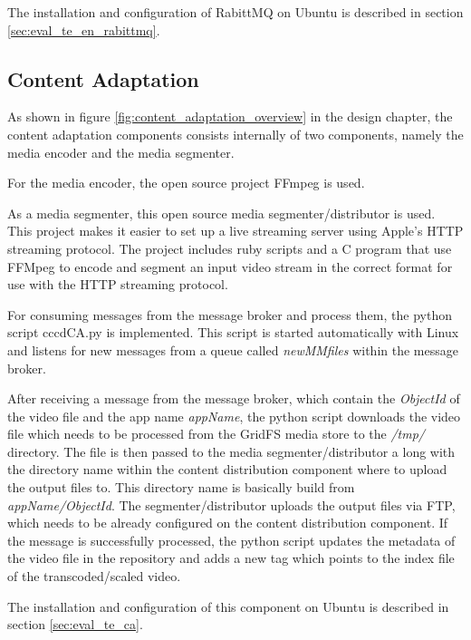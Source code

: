 The installation and configuration of RabittMQ on Ubuntu is described in section \ref{sec:eval_te_en_rabittmq}.

\subsection{Content Adaptation\label{sec:des_ar_ov}}
As shown in figure \ref{fig:content_adaptation_overview} in the design chapter, the content adaptation components consists internally of two components, namely the media encoder and the media segmenter. 

For the media encoder, the open source project FFmpeg is used. 

As a media segmenter, this open source media segmenter/distributor \cite{hlvssad} is used. This project makes it easier to set up a live streaming server using Apple's \ac{HTTP} streaming protocol. The project includes ruby scripts and a C program that use FFMpeg to encode and segment an input video stream in the correct format for use with the \ac{HTTP} streaming protocol.

For consuming messages from the message broker and process them, the python script cccdCA.py is implemented. This script is started automatically with Linux and listens for new messages from a queue called \textit{newMMfiles} within the message broker. %

After receiving a message from the message broker, which contain the \textit{ObjectId} of the video file and the app name \textit{appName}, the python script downloads the video file which needs to be processed from the GridFS media store to the \textit{/tmp/} directory. The file is then passed to the media segmenter/distributor a long with the directory name within the content distribution component where to upload the output files to. This directory name is basically build from \textit{appName/ObjectId}. The segmenter/distributor uploads the output files via FTP, which needs to be already configured on the content distribution component. If the message is successfully processed, the python script updates the metadata of the video file in the repository and adds a new tag which points to the index file of the transcoded/scaled video.

The installation and configuration of this component on Ubuntu is described in section \ref{sec:eval_te_ca}.
	
